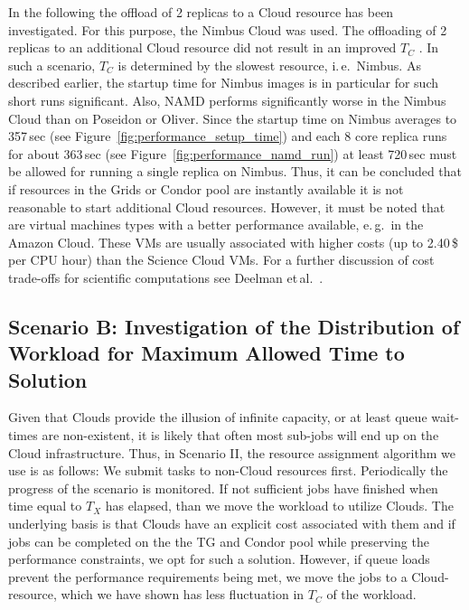 \documentclass[conference,final]{IEEEtran}
\newcommand{\tmax}{$T_{max}$ }
\newcommand{\tc}{$T_{C}$ }
\begin{document}
In the following the offload of 2 replicas to a Cloud resource has been
investigated. For this purpose, the Nimbus Cloud was used. The offloading of 2 replicas 
to an additional Cloud resource did not result in an 
improved \tc. In such a scenario, \tc is determined by
the slowest resource, i.\,e.\ Nimbus. As described earlier, the
startup time for Nimbus images is in particular for such short runs
significant. Also, NAMD performs significantly worse in the Nimbus
Cloud than on Poseidon or Oliver. Since the startup time on Nimbus
averages to 357\,sec (see Figure~\ref{fig:performance_setup_time}) and
each 8 core replica runs for about 363\,sec (see
Figure~\ref{fig:performance_namd_run}) at least 720\,sec must be
allowed for running a single replica on Nimbus. Thus, it can be
concluded that if resources in the Grids or Condor pool are instantly
available it is not reasonable to start additional Cloud resources.
However, it must be noted that are virtual machines types with a better
performance available, e.\,g.\ in the Amazon Cloud. These VMs 
are usually associated with higher costs (up to 2.40\,\$ per CPU hour) than
the Science Cloud VMs. For a further discussion of cost trade-offs for 
scientific computations see Deelman et\,al.~\cite{1413421}. 


\subsection{Scenario B: Investigation of the Distribution of Workload for Maximum Allowed
  Time to Solution} 

Given that Clouds provide the illusion of infinite capacity, or at
least queue wait-times are non-existent, it is likely that often most
sub-jobs will end up on the Cloud infrastructure.  Thus, in Scenario
II, the resource assignment algorithm we use is as follows: We submit
tasks to non-Cloud resources first. Periodically the progress of the
scenario is monitored. If not sufficient jobs have finished
when time equal to $T_{X}$ has elapsed,
than we move the workload to utilize Clouds.  The
underlying basis is that Clouds have an explicit cost associated with
them and if jobs can be completed on the the TG and Condor pool while
preserving the performance constraints, we opt for such a
solution. However, if queue loads prevent the performance requirements
being met, we move the jobs to a Cloud-resource, which we have shown
has less fluctuation in \tc of the workload.
\end{document}

